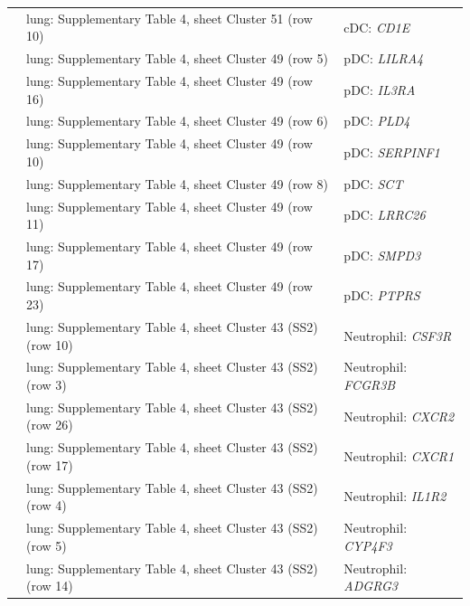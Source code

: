 \begin{longtable}{@{}>{\raggedright\arraybackslash}p{2.0cm} >{\raggedright\arraybackslash}p{4.6cm} >{\raggedright\arraybackslash}p{8.4cm}@{}}
\cite{travagliniMolecularCellAtlas2020} & lung: Supplementary Table 4, sheet Cluster 51 (row 10) & cDC: \textit{CD1E} \\
\cite{travagliniMolecularCellAtlas2020} & lung: Supplementary Table 4, sheet Cluster 49 (row 5) & pDC: \textit{LILRA4} \\
\cite{travagliniMolecularCellAtlas2020} & lung: Supplementary Table 4, sheet Cluster 49 (row 16) & pDC: \textit{IL3RA} \\
\cite{travagliniMolecularCellAtlas2020} & lung: Supplementary Table 4, sheet Cluster 49 (row 6) & pDC: \textit{PLD4} \\
\cite{travagliniMolecularCellAtlas2020} & lung: Supplementary Table 4, sheet Cluster 49 (row 10) & pDC: \textit{SERPINF1} \\
\cite{travagliniMolecularCellAtlas2020} & lung: Supplementary Table 4, sheet Cluster 49 (row 8) & pDC: \textit{SCT} \\
\cite{travagliniMolecularCellAtlas2020} & lung: Supplementary Table 4, sheet Cluster 49 (row 11) & pDC: \textit{LRRC26} \\
\cite{travagliniMolecularCellAtlas2020} & lung: Supplementary Table 4, sheet Cluster 49 (row 17) & pDC: \textit{SMPD3} \\
\cite{travagliniMolecularCellAtlas2020} & lung: Supplementary Table 4, sheet Cluster 49 (row 23) & pDC: \textit{PTPRS} \\
\cite{travagliniMolecularCellAtlas2020} & lung: Supplementary Table 4, sheet Cluster 43 (SS2) (row 10) & Neutrophil: \textit{CSF3R} \\
\cite{travagliniMolecularCellAtlas2020} & lung: Supplementary Table 4, sheet Cluster 43 (SS2) (row 3) & Neutrophil: \textit{FCGR3B} \\
\cite{travagliniMolecularCellAtlas2020} & lung: Supplementary Table 4, sheet Cluster 43 (SS2) (row 26) & Neutrophil: \textit{CXCR2} \\
\cite{travagliniMolecularCellAtlas2020} & lung: Supplementary Table 4, sheet Cluster 43 (SS2) (row 17) & Neutrophil: \textit{CXCR1} \\
\cite{travagliniMolecularCellAtlas2020} & lung: Supplementary Table 4, sheet Cluster 43 (SS2) (row 4) & Neutrophil: \textit{IL1R2} \\
\cite{travagliniMolecularCellAtlas2020} & lung: Supplementary Table 4, sheet Cluster 43 (SS2) (row 5) & Neutrophil: \textit{CYP4F3} \\
\cite{travagliniMolecularCellAtlas2020} & lung: Supplementary Table 4, sheet Cluster 43 (SS2) (row 14) & Neutrophil: \textit{ADGRG3} \\

\end{longtable}
